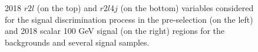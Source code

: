 \documentclass[a4paper, 10pt, openright]{report}
\begin{document}
\begin{itemize}
\begin{figure}[htbp]
\caption{2018 $r2l$ (on the top) and $r2l4j$ (on the bottom) variables considered for the signal discrimination process in the pre-selection (on the left) and 2018 scalar 100 GeV signal (on the right) regions for the backgrounds and several signal samples.}
\label{fig:r2l}
\end{figure}


\end{itemize}
\end{document}
